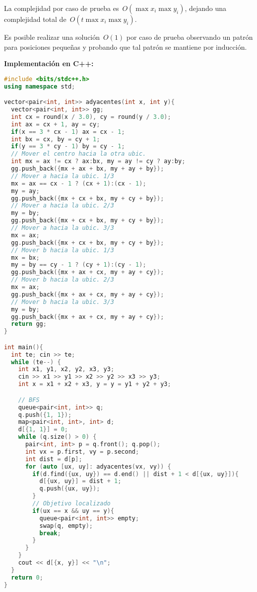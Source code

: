 La complejidad por caso de prueba es~$O(\max x_i \max y_i)$, dejando una complejidad
total de~$O(t \max x_i \max y_i)$.

Es posible realizar una solución~$O(1)$ por caso de prueba observando un patrón para
posiciones pequeñas y probando que tal patrón se mantiene por inducción.

\textbf{Implementación en C++:}

\begin{lstlisting}[language=C++]
#include <bits/stdc++.h>
using namespace std;

vector<pair<int, int>> adyacentes(int x, int y){
  vector<pair<int, int>> gg;
  int cx = round(x / 3.0), cy = round(y / 3.0);
  int ax = cx + 1, ay = cy;
  if(x == 3 * cx - 1) ax = cx - 1;
  int bx = cx, by = cy + 1;
  if(y == 3 * cy - 1) by = cy - 1;
  // Mover el centro hacia la otra ubic.
  int mx = ax != cx ? ax:bx, my = ay != cy ? ay:by;
  gg.push_back({mx + ax + bx, my + ay + by});
  // Mover a hacia la ubic. 1/3
  mx = ax == cx - 1 ? (cx + 1):(cx - 1);
  my = ay;
  gg.push_back({mx + cx + bx, my + cy + by});
  // Mover a hacia la ubic. 2/3
  my = by;
  gg.push_back({mx + cx + bx, my + cy + by});
  // Mover a hacia la ubic. 3/3
  mx = ax;
  gg.push_back({mx + cx + bx, my + cy + by});
  // Mover b hacia la ubic. 1/3
  mx = bx;
  my = by == cy - 1 ? (cy + 1):(cy - 1);
  gg.push_back({mx + ax + cx, my + ay + cy});
  // Mover b hacia la ubic. 2/3
  mx = ax;
  gg.push_back({mx + ax + cx, my + ay + cy});
  // Mover b hacia la ubic. 3/3
  my = by;
  gg.push_back({mx + ax + cx, my + ay + cy});
  return gg;
}

int main(){
  int te; cin >> te;
  while (te--) {
    int x1, y1, x2, y2, x3, y3;
    cin >> x1 >> y1 >> x2 >> y2 >> x3 >> y3;
    int x = x1 + x2 + x3, y = y = y1 + y2 + y3;

    // BFS
    queue<pair<int, int>> q;
    q.push({1, 1});
    map<pair<int, int>, int> d;
    d[{1, 1}] = 0;
    while (q.size() > 0) {
      pair<int, int> p = q.front(); q.pop();
      int vx = p.first, vy = p.second;
      int dist = d[p];
      for (auto [ux, uy]: adyacentes(vx, vy)) {
        if(d.find({ux, uy}) == d.end() || dist + 1 < d[{ux, uy}]){
          d[{ux, uy}] = dist + 1;
          q.push({ux, uy});
        }
        // Objetivo localizado
        if(ux == x && uy == y){
          queue<pair<int, int>> empty;
          swap(q, empty);
          break;
        }
      }
    }
    cout << d[{x, y}] << "\n";
  }
  return 0;
}
\end{lstlisting}

\newpage


